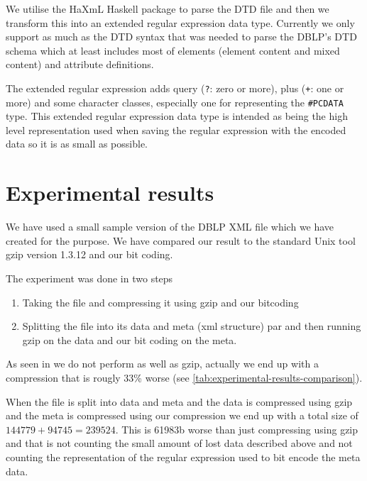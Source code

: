 \documentclass[a4paper, oneside]{memoir}
\let\fref\undefined
\theoremstyle{definition}
\begin{document}
We utilise the HaXmL Haskell package to parse the DTD file and then we transform
this into an extended regular expression data type. Currently we only support as
much as the DTD syntax that was needed to parse the DBLP's DTD schema which at
least includes most of elements (element content and mixed content) and
attribute definitions.

The extended regular expression adds query (\texttt{?}: zero or more), plus
(\texttt{+}: one or more) and some character classes, especially one for
representing the \texttt{\#PCDATA} type. This extended regular expression data
type is intended as being the high level representation used when saving the
regular expression with the encoded data so it is as small as possible.

\chapter{Experimental results}
\label{chap:experimental_results}


We have used a small sample version of the DBLP XML file which we have created
for the purpose. We have compared our result to the standard Unix tool gzip
version 1.3.12 and our bit coding.


The experiment was done in two steps

\begin{enumerate}
\item Taking the file and compressing it using gzip and our bitcoding

\item Splitting the file into its data and meta (xml structure) par  and then running gzip on the data and our bit coding on
  the meta.
\end{enumerate}

As seen in \fref{tab:experimental-results} we do not perform as well as gzip,
actually we end up with a compression that is rougly 33\% worse (see
\ref{tab:experimental-results-comparison}).

When the file is split into data and meta and the data is compressed using gzip
and the meta is compressed using our compression we end up with a total size of
$144779+94745 = 239524$. This is 61983b worse than just compressing using gzip
and that is not counting the small amount of lost data described above and not
counting the representation of the regular expression used to bit encode the
meta data.

\let\fs\footnotesize
\end{document}
